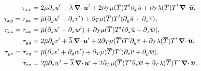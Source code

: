 \documentclass{article}
\begin{document}
\begin{align*}
  \tau_{xx} & = 2 \overline{\mu} \partial_x u' + \overline{\lambda} \operatorname{\boldsymbol{\mathrm{\nabla}}\cdot} \bm{u}' + 2 \partial_T \mu (\overline{T}) T' \partial_x \overline{u} + \partial_T \lambda (\overline{T}) T' \operatorname{\boldsymbol{\mathrm{\nabla}}\cdot} \overline{\bm{u}}, \\
  \tau_{xy}=\tau_{yx} & = \overline{\mu} (\partial_y u' + \partial_x v') + \partial_T \mu (\overline{T}) T' (\partial_y \overline{u} + \partial_x \overline{v}),                                               \\
  \tau_{xz} =\tau_{zx}& = \overline{\mu} (\partial_z u' + \partial_x w') + \partial_T \mu (\overline{T}) T' (\partial_z \overline{u} + \partial_x \overline{w}),                                               \\
  \tau_{yy} & = 2 \overline{\mu} \partial_y v' + \overline{\lambda} \operatorname{\boldsymbol{\mathrm{\nabla}}\cdot} \bm{u}' + 2 \partial_T \mu (\overline{T}) T' \partial_y \overline{v} + \partial_T \lambda (\overline{T}) T' \operatorname{\boldsymbol{\mathrm{\nabla}}\cdot} \overline{\bm{u}}, \\
  \tau_{yz} =\tau_{zy}& = \overline{\mu} (\partial_z v' + \partial_y w') + \partial_T \mu (\overline{T}) T' (\partial_z \overline{v} + \partial_y \overline{w}),                                               \\
  \tau_{zz} & = 2 \overline{\mu} \partial_z w' + \overline{\lambda} \operatorname{\boldsymbol{\mathrm{\nabla}}\cdot} \bm{u}' + 2 \partial_T \mu (\overline{T}) T' \partial_z \overline{w} + \partial_T \lambda (\overline{T}) T' \operatorname{\boldsymbol{\mathrm{\nabla}}\cdot} \overline{\bm{u}}.
\end{align*}
\end{document}
